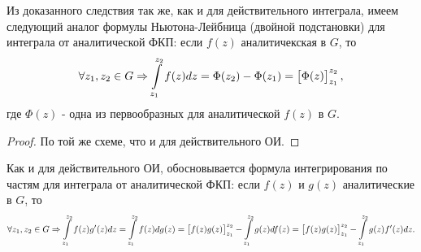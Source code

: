 \begin{notes}
\item Из доказанного следствия так же, как и для действительного интеграла, имеем следующий аналог
  формулы Ньютона-Лейбница (двойной подстановки) для интеграла от аналитической ФКП: если
  $f(z)$ аналитичекская в $G$, то
  \begin{align*}
    \label{eq:lecture16-08}
    \forall z_1,z_2 \in G \Rightarrow \int\limits_{z_1}^{z_2}f(z)dz = \Phi(z_2) - \Phi(z_1) =
    \left[\begin{matrix}\Phi(z)\end{matrix}\right]_{z_1}^{z_2},
  \end{align*}
  где $\Phi(z)$ - одна из первообразных для аналитической $f(z)$ в $G$.
  \begin{proof}
    По той же схеме, что и для действительного ОИ.
  \end{proof}
\item Как и для действительного ОИ, обосновывается формула интегрирования по частям для интеграла
  от аналитической ФКП: если $f(z)$ и $g(z)$ аналитические в $G$, то
  \begin{align*}
    \forall z_1, z_2 \in G \Rightarrow \int\limits_{z_1}^{z_2}f(z)g'(z)dz = \int\limits_{z_1}^{z_2}f(z)dg(z) =
    \left[\begin{matrix}f(z)g(z)\end{matrix}\right]_{z_1}^{z_2} - \int\limits_{z_1}^{z_2}g(z)df(z) =
    \left[\begin{matrix}f(z)g(z)\end{matrix}\right]_{z_1}^{z_2} - \int\limits_{z_1}^{z_2}g(z)f'(z)dz.
  \end{align*}
\end{notes}

